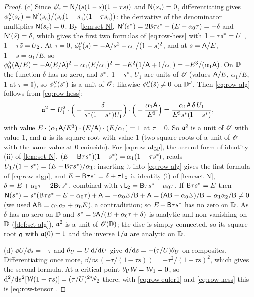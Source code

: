 \begin{proof}
(c) Since $\phi_\tau'=\mathsf{N}/(s(1-s)(1-\tau s))$ and $\mathsf{N}(s_c)=0$, differentiating gives $\phi_\tau''(s_c)=\mathsf{N}'(s_c)/(s_c(1-s_c)(1-\tau s_c))$: the derivative of the denominator multiplies $\mathsf{N}(s_c)=0$. By \cref{lem:set-N}, $\mathsf{N}'(s^{\ast})=2\mathsf{B}\tau s^{\ast}-(E+\alpha_0\tau)=-\delta$ and $\mathsf{N}'(\tilde{s})=\delta$, which gives the first two formulas of \eqref{eq:row-hess} with $1-\tau s^{\ast}=U_1$, $1-\tau\tilde{s}=U_2$. At $\tau=0$, $\phi_0''(s)=-\mathsf{A}/s^2-\alpha_1/(1-s)^2$, and at $s=\mathsf{A}/E$, $1-s=\alpha_1/E$, so $\phi_0''(\mathsf{A}/E)=-\mathsf{A}(E/\mathsf{A})^2-\alpha_1(E/\alpha_1)^2=-E^2(1/\mathsf{A}+1/\alpha_1)=-E^3/(\alpha_1\mathsf{A})$. On $\mathbb{D}$ the function $\delta$ has no zero, and $s^{\ast}$, $1-s^{\ast}$, $U_1$ are units of $\mathscr{O}$ (values $\mathsf{A}/E$, $\alpha_1/E$, $1$ at $\tau=0$), so $\phi_\tau''(s^{\ast})$ is a unit of $\mathscr{O}$; likewise $\phi_\tau''(\tilde{s})\neq0$ on $\mathbb{D}''$. Then \eqref{eq:row-alg} follows from \eqref{eq:row-hess}:
\[
\mathfrak{a}^2=U_1^2\cdot\Big(-\frac{\delta}{s^{\ast}(1-s^{\ast})U_1}\Big)\cdot\Big(-\frac{\alpha_1\mathsf{A}}{E^3}\Big)=\frac{\alpha_1\mathsf{A}\,\delta\,U_1}{E^3s^{\ast}(1-s^{\ast})},
\]
with value $E\cdot(\alpha_1\mathsf{A}/E^3)\cdot(E/\mathsf{A})\cdot(E/\alpha_1)=1$ at $\tau=0$. So $\mathfrak{a}^2$ is a unit of $\mathscr{O}$ with value $1$, and $\mathfrak{a}$ is its square root with value $1$ (two square roots of a unit of $\mathscr{O}$ with the same value at $0$ coincide). For \eqref{eq:row-algp}, the second form of identity (ii) of \cref{lem:set-N}, $(E-\mathsf{B}\tau s^{\ast})(1-s^{\ast})=\alpha_1(1-\tau s^{\ast})$, reads $U_1/(1-s^{\ast})=(E-\mathsf{B}\tau s^{\ast})/\alpha_1$; inserting it into \eqref{eq:row-alg} gives the first formula of \eqref{eq:row-algp}, and $E-\mathsf{B}\tau s^{\ast}=\delta+\tau\mathsf{L}_2$ is identity (i) of \cref{lem:set-N}, $\delta=E+\alpha_0\tau-2\mathsf{B}\tau s^{\ast}$, combined with $\tau\mathsf{L}_2=\mathsf{B}\tau s^{\ast}-\alpha_0\tau$. If $\mathsf{B}\tau s^{\ast}=E$ then $\mathsf{N}(s^{\ast})=s^{\ast}(\mathsf{B}\tau s^{\ast}-E-\alpha_0\tau)+\mathsf{A}=-\alpha_0E/\mathsf{B}+\mathsf{A}=(\mathsf{A}\mathsf{B}-\alpha_0E)/\mathsf{B}=\alpha_1\alpha_2/\mathsf{B}\neq0$ (we used $\mathsf{A}\mathsf{B}=\alpha_1\alpha_2+\alpha_0E$), a contradiction; so $E-\mathsf{B}\tau s^{\ast}$ has no zero on $\mathbb{D}$. As $\delta$ has no zero on $\mathbb{D}$ and $s^{\ast}=2\mathsf{A}/(E+\alpha_0\tau+\delta)$ is analytic and non-vanishing on $\mathbb{D}$ (\cref{def:set-alg}), $\mathfrak{a}^2$ is a unit of $\mathscr{O}(\mathbb{D})$; the disc is simply connected, so its square root $\mathfrak{a}$ with $\mathfrak{a}(0)=1$ and the inverse $1/\mathfrak{a}$ are analytic on $\mathbb{D}$.

(d) $\dd U/\dd s=-\tau$ and $\theta_{U}=U\,\mathrm{d}/\mathrm{d} U$ give $\mathrm{d}/\mathrm{d} s=-(\tau/U)\theta_{U}$ on composites. Differentiating once more, $\dd/\dd s\,(-\tau/(1-\tau s))=-\tau^2/(1-\tau s)^2$, which gives the second formula. At a critical point $\theta_{U}\mathcal{W}=\mathcal{W}_1=0$, so $\mathrm{d}^2/\mathrm{d} s^2[\mathcal{W}(1-\tau s)]=(\tau/U)^2\mathcal{W}_2$ there; with \eqref{eq:row-euler1} and \eqref{eq:row-hess} this is \eqref{eq:row-tensor}.
\end{proof}

